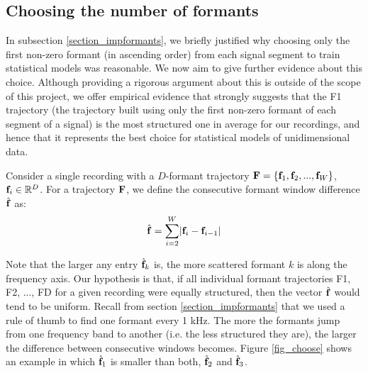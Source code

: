 \documentclass[../main.tex]{subfiles}
\begin{document}
\subsection{Choosing the number of formants} \label{section_choosing}
In subsection \ref{section_impformants}, we briefly justified why choosing only the first non-zero formant (in ascending order) from each signal segment to train statistical models was reasonable. We now aim to give further evidence about this choice. Although providing a rigorous argument about this is outside of the scope of this project, we offer empirical evidence that strongly suggests that the F1 trajectory (the trajectory built using only the first non-zero formant of each segment of a signal) is the most structured one in average for our recordings, and hence that it represents the best choice for statistical models of unidimensional data. 
\par Consider a single recording with a $D$-formant trajectory $\mathbf{F} = \{\mathbf{f}_1, \mathbf{f}_2, ..., \mathbf{f}_W\}$, $\mathbf{f}_i \in \mathbb{R}^D$. For a trajectory $\mathbf{F}$, we define the consecutive formant window difference $\hat{\mathbf{f}}$ as:
\begin{align*} 
\hat{\mathbf{f}} = \sum_{i=2}^W \lvert\mathbf{f}_{i} - \mathbf{f}_{i-1}\rvert
\end{align*}
\par Note that the larger any entry $\hat{\mathbf{f}}_k$ is, the more scattered formant $k$ is along the frequency axis. Our hypothesis is that, if all individual formant trajectories F1, F2, ..., FD for a given recording were equally structured, then the vector $\hat{\mathbf{f}}$ would tend to be uniform. Recall from section \ref{section_impformants} that we used a rule of thumb to find one formant every 1 kHz. The more the formants jump from one frequency band to another (i.e. the less structured they are), the larger the difference between consecutive windows becomes. Figure \ref{fig_choose} shows an example in which $\hat{\mathbf{f}}_1$ is smaller than both, $\hat{\mathbf{f}}_2$ and $\hat{\mathbf{f}}_3$.
\end{document}
